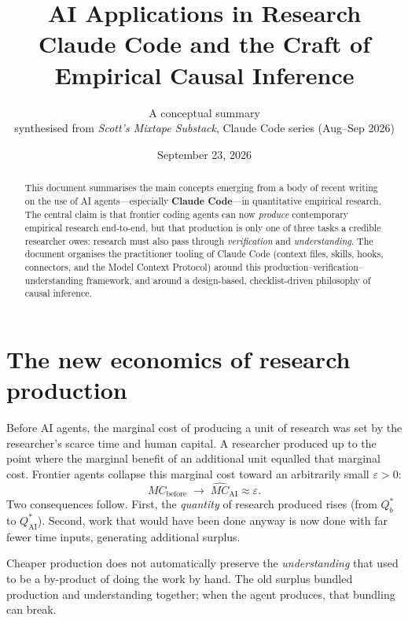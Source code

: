 \documentclass[11pt]{article}
\title{\textbf{AI Applications in Research}\\[4pt]
\large Claude Code and the Craft of Empirical Causal Inference}
\author{A conceptual summary\\
\small synthesised from \emph{Scott's Mixtape Substack}, Claude Code series (Aug--Sep 2026)}
\date{September 23, 2026}
\begin{document}
\maketitle

\begin{abstract}
\noindent This document summarises the main concepts emerging from a body of
recent writing on the use of AI agents---especially \textbf{Claude Code}---in
quantitative empirical research. The central claim is that frontier coding
agents can now \emph{produce} contemporary empirical research end-to-end, but
that production is only one of three tasks a credible researcher owes: research
must also pass through \emph{verification} and \emph{understanding}. The
document organises the practitioner tooling of Claude Code (context files,
skills, hooks, connectors, and the Model Context Protocol) around this
production--verification--understanding framework, and around a design-based,
checklist-driven philosophy of causal inference.
\end{abstract}

\tableofcontents
\bigskip

\section{The new economics of research production}

Before AI agents, the marginal cost of producing a unit of research was set by
the researcher's scarce time and human capital. A researcher produced up to the
point where the marginal benefit of an additional unit equalled that marginal
cost. Frontier agents collapse this marginal cost toward an arbitrarily small
$\varepsilon > 0$:
\[
  MC_{\text{before}} \;\longrightarrow\; \widehat{MC}_{\text{AI}} \approx \varepsilon .
\]
Two consequences follow. First, the \emph{quantity} of research produced rises
(from $Q^{*}_{b}$ to $Q^{*}_{\text{AI}}$). Second, work that would have been done
anyway is now done with far fewer time inputs, generating additional surplus.

\begin{keyidea}
Cheaper production does not automatically preserve the \emph{understanding} that
used to be a by-product of doing the work by hand. The old surplus bundled
production and understanding together; when the agent produces, that bundling
can break.
\end{keyidea}
\end{document}
